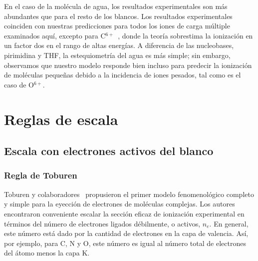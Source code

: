 En el caso de la molécula de agua, los resultados experimentales son más 
abundantes que para el resto de los blancos. Los resultados 
experimentales~\cite{Luna2007,Bolorizadeh86,H_Rudd85,Ohsawa05,He_Rudd85,
toburen80,Bhattacharjee:16} coinciden con nuestras predicciones para 
todos los iones de carga múltiple examinados aquí, excepto para 
C$^{6+}$~\cite{DalCappello:09,Bhattacharjee:17}, donde la teoría 
sobrestima la ionización en un factor dos en el rango de altas energías. 
A diferencia de las nucleobases, pirimidina y THF, la estequiometría del 
agua es más simple; sin embargo, observamos que nuestro modelo responde 
bien incluso para predecir la ionización de moléculas pequeñas debido a 
la incidencia de iones pesados, tal como es el caso de O$^{6+}$.

\section{Reglas de escala}
\label{sec:scaling}

\subsection{Escala con electrones activos del blanco}
\label{subsec:ne_scaling}

\subsubsection{Regla de Toburen}
\label{subsec:toburen}

Toburen y colaboradores~\cite{Toburen:75,Toburen:76} propusieron el 
primer modelo fenomenológico completo y simple para la eyección de 
electrones de moléculas complejas. Los autores encontraron conveniente 
escalar la sección eficaz de ionización experimental en términos del 
número de electrones ligados débilmente, o activos, $n_e$. En general, 
este número está dado por la cantidad de electrones en la capa de 
valencia. Así, por ejemplo, para C, N y O, este número es igual al número 
total de electrones del átomo menos la capa K. 

